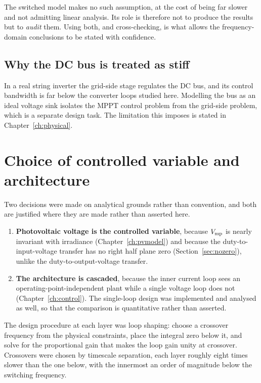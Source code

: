 The switched model makes no such assumption, at the cost of being far slower and
not admitting linear analysis. Its role is therefore not to produce the results
but to \emph{audit} them. Using both, and cross-checking, is what allows the
frequency-domain conclusions to be stated with confidence.

\subsection{Why the DC bus is treated as stiff}

In a real string inverter the grid-side stage regulates the DC bus, and its
control bandwidth is far below the converter loops studied here. Modelling the
bus as an ideal voltage sink isolates the MPPT control problem from the grid-side
problem, which is a separate design task. The limitation this imposes is stated
in Chapter~\ref{ch:physical}.

\section{Choice of controlled variable and architecture}

Two decisions were made on analytical grounds rather than convention, and both
are justified where they are made rather than asserted here.

\begin{enumerate}[leftmargin=1.6em]
  \item \textbf{Photovoltaic voltage is the controlled variable}, because
        $V_{\mathrm{mp}}$ is nearly invariant with irradiance
        (Chapter~\ref{ch:pvmodel}) and because the duty-to-input-voltage
        transfer has no right half plane zero
        (Section~\ref{sec:nozero}), unlike the duty-to-output-voltage transfer.
  \item \textbf{The architecture is cascaded}, because the inner current loop
        sees an operating-point-independent plant while a single voltage loop
        does not (Chapter~\ref{ch:control}). The single-loop design was
        implemented and analysed as well, so that the comparison is quantitative
        rather than asserted.
\end{enumerate}

The design procedure at each layer was loop shaping: choose a crossover
frequency from the physical constraints, place the integral zero below it, and
solve for the proportional gain that makes the loop gain unity at crossover.
Crossovers were chosen by timescale separation, each layer roughly eight times
slower than the one below, with the innermost an order of magnitude below the
switching frequency.


